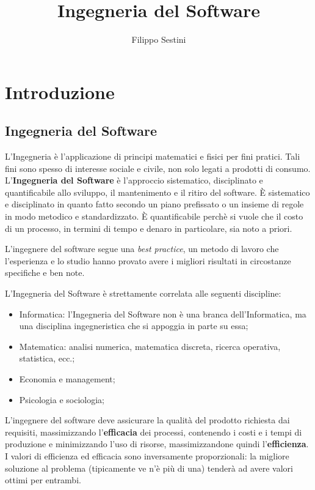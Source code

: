 \documentclass[10pt,a4paper]{article}
\title{Ingegneria del Software}
\author{Filippo Sestini}
\newcommand{\strong}[1]{\textbf{#1}}
\newcommand{\frgnword}[1]{\textit{#1}}
\begin{document}
\maketitle
\tableofcontents

\section{Introduzione}
\subsection{Ingegneria del Software}
L'Ingegneria è l'applicazione di principi matematici e fisici per fini pratici. Tali fini sono spesso di interesse sociale e civile, non solo legati a prodotti di consumo. L'\strong{\gls{Ingegneria del Software}} è l'approccio sistematico, disciplinato e quantificabile allo sviluppo, il mantenimento e il ritiro del software. È sistematico e disciplinato in quanto fatto secondo un piano prefissato o un insieme di regole in modo metodico e standardizzato. È quantificabile perchè si vuole che il costo di un processo, in termini di tempo e denaro in particolare, sia noto a priori.

L'ingegnere del software segue una \frgnword{\gls{best practice}}, un metodo di lavoro che l'esperienza e lo studio hanno provato avere i migliori risultati in circostanze specifiche e ben note.

L'Ingegneria del Software è strettamente correlata alle seguenti discipline:
\begin{itemize}
	\item Informatica: l'Ingegneria del Software non è una branca dell'Informatica, ma una disciplina ingegneristica che si appoggia in parte su essa;
	\item Matematica: analisi numerica, matematica discreta, ricerca operativa, statistica, ecc.;
	\item Economia e management;
	\item Psicologia e sociologia;
\end{itemize}

L'ingegnere del software deve assicurare la qualità del prodotto richiesta dai requisiti, massimizzando l'\strong{\gls{efficacia}} dei processi, contenendo i costi e i tempi di produzione e minimizzando l'uso di risorse, massimizzandone quindi l'\strong{\gls{efficienza}}. I valori di efficienza ed efficacia sono inversamente proporzionali: la migliore soluzione al problema (tipicamente ve n'è più di una) tenderà ad avere valori ottimi per entrambi.
\end{document}
